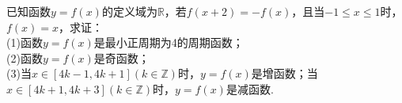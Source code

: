 \begin{exercise}
\begin{answer}
      \end{answer}
    \vspace{6.5cm}
    \item%
      已知函数$y=f(x)$的定义域为$\mathbb{R}$，若$f(x+2)=-f(x)$，且当$-1\leqslant x\leqslant 1$时，$f(x)=x$，求证：\\
      (1)函数$y=f(x)$是最小正周期为4的周期函数；\\
      (2)函数$y=f(x)$是奇函数；\\
      (3)当$x\in[4k-1,4k+1](k\in\mathbb{Z})$时，$y=f(x)$是增函数；当$x\in[4k+1,4k+3](k\in\mathbb{Z})$时，$y=f(x)$是减函数.
  \end{exercise}

\newpage
